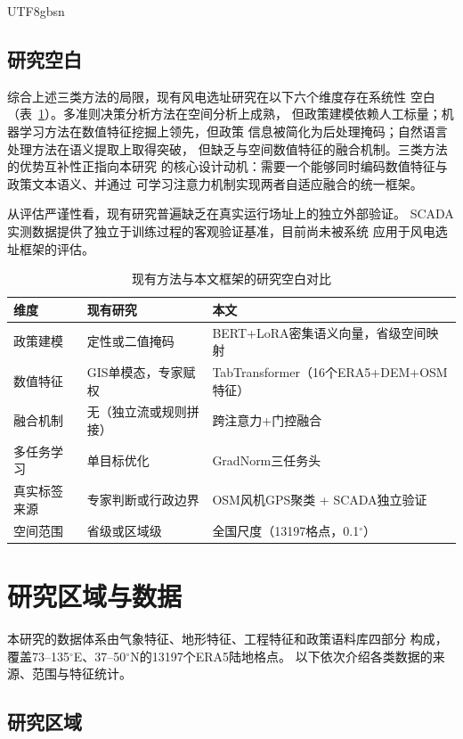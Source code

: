 \documentclass[12pt, a4paper]{article}
\begin{document}
\begin{CJK}{UTF8}{gbsn}
\subsection{研究空白}

综合上述三类方法的局限，现有风电选址研究在以下六个维度存在系统性
空白（表~\ref{tab:gap}）。多准则决策分析方法在空间分析上成熟，
但政策建模依赖人工标量；机器学习方法在数值特征挖掘上领先，但政策
信息被简化为后处理掩码；自然语言处理方法在语义提取上取得突破，
但缺乏与空间数值特征的融合机制。三类方法的优势互补性正指向本研究
的核心设计动机：需要一个能够同时编码数值特征与政策文本语义、并通过
可学习注意力机制实现两者自适应融合的统一框架。

从评估严谨性看，现有研究普遍缺乏在真实运行场址上的独立外部验证。
SCADA实测数据提供了独立于训练过程的客观验证基准，目前尚未被系统
应用于风电选址框架的评估。

\begin{table}[H]
\centering
\caption{现有方法与本文框架的研究空白对比}
\label{tab:gap}
\small
\begin{tabularx}{\textwidth}{lXX}
\toprule
\textbf{维度} & \textbf{现有研究} & \textbf{本文} \\
\midrule
政策建模 & 定性或二值掩码 &
  BERT+LoRA密集语义向量，省级空间映射 \\
数值特征 & GIS单模态，专家赋权 &
  TabTransformer（16个ERA5+DEM+OSM特征） \\
融合机制 & 无（独立流或规则拼接） & 跨注意力+门控融合 \\
多任务学习 & 单目标优化 & GradNorm三任务头 \\
真实标签来源 & 专家判断或行政边界 &
  OSM风机GPS聚类 + SCADA独立验证 \\
空间范围 & 省级或区域级 &
  全国尺度（13197格点，0.1$^\circ$） \\
\bottomrule
\end{tabularx}
\end{table}

\section{研究区域与数据}

本研究的数据体系由气象特征、地形特征、工程特征和政策语料库四部分
构成，覆盖73--135$^\circ$E、37--50$^\circ$N的13197个ERA5陆地格点。
以下依次介绍各类数据的来源、范围与特征统计。

\subsection{研究区域}


\end{CJK}
\end{document}

